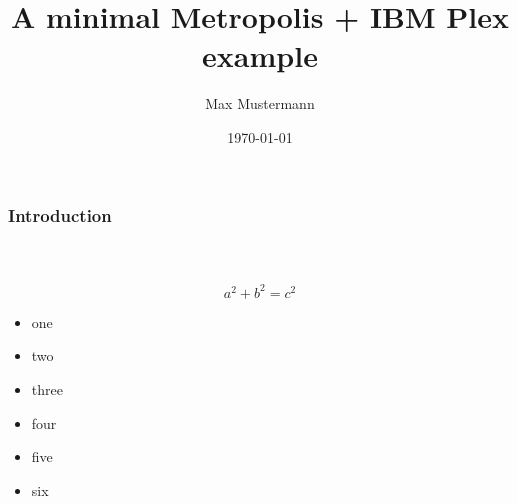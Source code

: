 \documentclass[12pt]{beamer}
\title{A minimal Metropolis + IBM Plex example}
\date{\today}
\author{Max Mustermann}
\institute{The Name of the Institute}
\begin{document}
 
\begin{frame}
	 \maketitle
\end{frame}
 
\begin{frame}
\frametitle{Introduction}
\framesubtitle{~}
 
\[ a^2 + b^2 = c^2 \]

\end{frame}
 
\begin{itemize}
\item  one
\item  two
\item  three
\item  four
\item  five
\item  six
\end{itemize}


 
\end{document}
